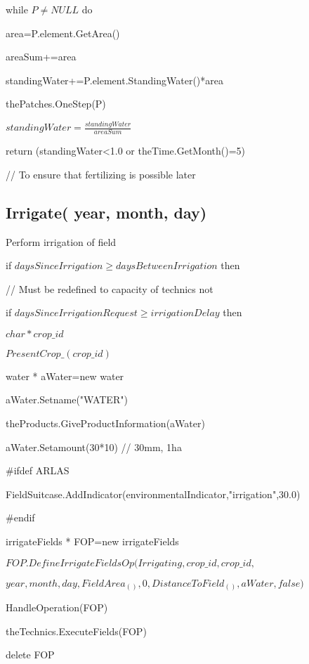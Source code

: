 \documentclass[%
]{scrartcl}
\begin{document}
{   while $P\ne NULL$ do
      
        \quad area=P.element.GetArea()
      
       \quad areaSum+=area
      
      \quad  standingWater+=P.element.StandingWater()*area
      
      \quad  thePatches.OneStep(P)
   
$   standingWater=\tfrac{standingWater}{areaSum}$
   
   return (standingWater<1.0  or  theTime.GetMonth()=5)
   
	// To ensure that fertilizing is possible later



\subsection{Irrigate( year, month, day)}
Perform irrigation of field


   if $daysSinceIrrigation\ge daysBetweenIrrigation$ then
   
	\quad  // Must be redefined to capacity of technics not 
   
    \quad   if $daysSinceIrrigationRequest\ge irrigationDelay$ then
      
	 \quad  \quad  	$char * crop\_id$
	 
	\quad \quad $PresentCrop\_(crop\_id)$
	
	\quad \quad water * aWater=new water
	
	\quad \quad	aWater.Setname("WATER")
	
\quad\quad   theProducts.GiveProductInformation(aWater)
	
\quad\quad  aWater.Setamount(30*10)  // 30mm, 1ha

\#ifdef ARLAS

		 \quad   \quad FieldSuitcase.AddIndicator(environmentalIndicator,"irrigation",30.0)

\#endif

	\quad \quad 		irrigateFields * FOP=new
	 irrigateFields
   
   \quad   \quad   $  FOP.DefineIrrigateFieldsOp(Irrigating,crop\_id,crop\_id,$

\quad   \quad $year,month,day,FieldArea_(),0,DistanceToField_(),aWater,false)
$

\quad 	\quad 	   HandleOperation(FOP)

\quad 	\quad 		theTechnics.ExecuteFields(FOP)

 \quad   \quad       delete FOP

}
\end{document}
